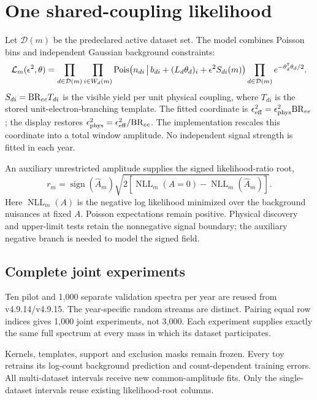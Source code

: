 \documentclass[11pt]{article}
\begin{document}
\clearpage


\clearpage

\clearpage
\section{One shared-coupling likelihood}
Let $\mathcal D(m)$ be the predeclared active dataset set. The model combines Poisson bins and independent Gaussian background constraints:
\[
 \mathcal L_m(\epsilon^2,\theta)=
 \prod_{d\in\mathcal D(m)}\prod_{i\in W_d(m)}
 {\rm Pois}\!\left(n_{di}\,\middle|\,b_{di}+(L_d\theta_d)_i+
                   \epsilon^2 S_{di}(m)\right)
 \prod_{d\in\mathcal D(m)} e^{-\theta_d^{\mathsf T}\theta_d/2}.
\]
$S_{di}={\rm BR}_{ee}T_{di}$ is the visible yield per unit physical coupling, where $T_{di}$ is the stored unit-electron-branching template. The fitted coordinate is $\epsilon_{\rm eff}^2=\epsilon_{\rm phys}^2{\rm BR}_{ee}$; the display restores $\epsilon_{\rm phys}^2=\epsilon_{\rm eff}^2/{\rm BR}_{ee}$. The implementation rescales this coordinate into a total window amplitude. No independent signal strength is fitted in each year.

An auxiliary unrestricted amplitude supplies the signed likelihood-ratio root,
\[
 r_m=\operatorname{sign}(\widehat A_m)
 \sqrt{2\left[\operatorname{NLL}_m(A=0)-\operatorname{NLL}_m(\widehat A_m)\right]}.
\]
Here $\operatorname{NLL}_m(A)$ is the negative log likelihood minimized over the background nuisances at fixed $A$. Poisson expectations remain positive. Physical discovery and upper-limit tests retain the nonnegative signal boundary; the auxiliary negative branch is needed to model the signed field.

\subsection*{Complete joint experiments}
Ten pilot and 1,000 separate validation spectra per year are reused from v4.9.14/v4.9.15. The year-specific random streams are distinct. Pairing equal row indices gives 1,000 joint experiments, not 3,000. Each experiment supplies exactly the same full spectrum at every mass in which its dataset participates.

Kernels, templates, support and exclusion masks remain frozen. Every toy retrains its log-count background prediction and count-dependent training errors. All multi-dataset intervals receive new common-amplitude fits. Only the single-dataset intervals reuse existing likelihood-root columns.
\end{document}
